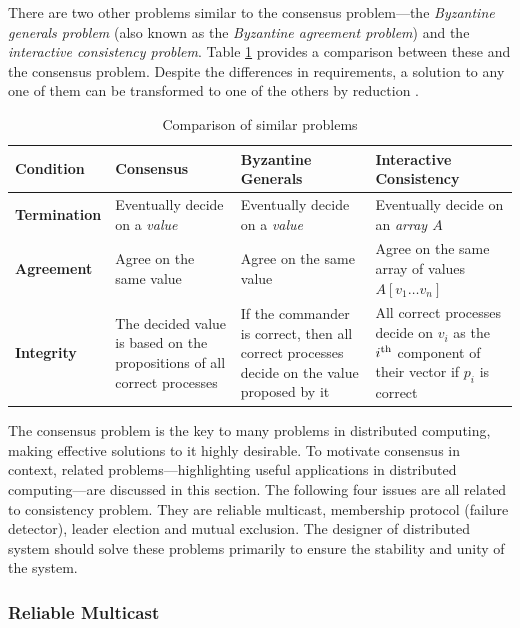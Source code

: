 \documentclass[12pt, a4paper]{article}
\begin{document}
There are two other problems similar to the consensus problem---the
\textit{Byzantine generals problem} (also known as the \textit{Byzantine
agreement problem}) and the \textit{interactive consistency problem}. Table
\ref{tab:dbtap} provides a comparison between these and the consensus problem.
Despite the differences in requirements, a solution to any one of them can be
transformed to one of the others by reduction \cite{fischer1983consensus}.

\begin{table}[htp]
  \centering
  \begin{tabularx}{\linewidth}{%
    l%
    >{\raggedright\arraybackslash}X%
    >{\raggedright\arraybackslash}X%
    >{\raggedright\arraybackslash}X}
  \toprule
  Condition & Consensus & Byzantine Generals & Interactive Consistency \\
  \midrule
  \textbf{Termination} & Eventually decide on a \textit{value}
    & Eventually decide on a \textit{value}
    & Eventually decide on an \textit{array $A$} \\
  \addlinespace
  \textbf{Agreement} & Agree on the same value
    & Agree on the same value
    & Agree on the same array of values $A[v_{1} \ldots v_{n}]$ \\
  \addlinespace
  \textbf{Integrity}
    & The decided value is based on the propositions of all correct processes
    & If the commander is correct, then all correct processes decide on the
      value proposed by it
    & All correct processes decide on $v_{i}$ as the $i\textsuperscript{th}$
      component of their vector if $p_{i}$ is correct \\
  \bottomrule
\end{tabularx}
  \caption{Comparison of similar problems}
  \label{tab:dbtap}
\end{table}

The consensus problem is the key to many problems in distributed computing,
making effective solutions to it highly desirable\cite{fritzke2001consensus}. To
motivate consensus in context, related problems—highlighting useful applications
in distributed computing—are discussed in this section. The following four
issues are all related to consistency problem. They are reliable multicast,
membership protocol (failure detector), leader election and mutual exclusion.
The designer of distributed system should solve these problems primarily to
ensure the stability and unity of the system.

\subsubsection{Reliable Multicast}
\end{document}
